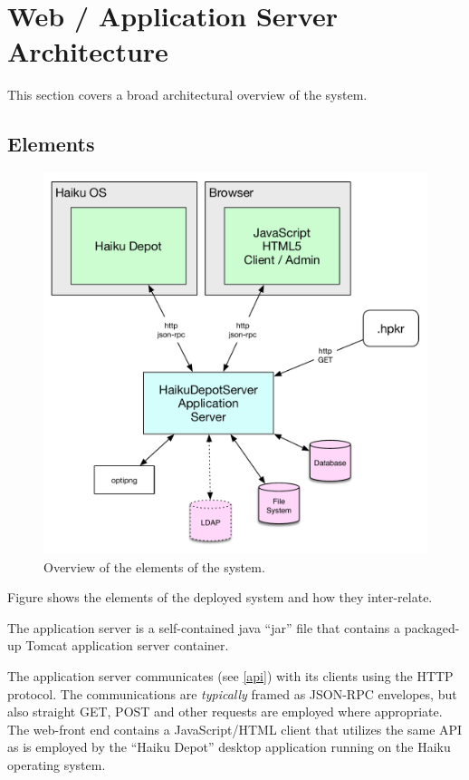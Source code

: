 
\section{Web / Application Server Architecture}

This section covers a broad architectural overview of the system.

\subsection{Elements}

\begin{figure}
\centering
\vspace{.2in}
\includegraphics[width=5in]{img-architectureoverview.pdf}
\caption{Overview of the elements of the system.}
\label{\thefigure}
\end{figure}

Figure {\thefigure} shows the elements of the deployed system and how they inter-relate.

The application server is a self-contained java ``jar'' file that contains a packaged-up Tomcat application server container.

The application server communicates (see \ref{api}) with its clients using the HTTP protocol.  The communications are {\it typically} framed as JSON-RPC envelopes, but also straight GET, POST and other requests are employed where appropriate.  The web-front end contains a JavaScript/HTML client that utilizes the same API as is employed by the ``Haiku Depot'' desktop application running on the Haiku operating system.

